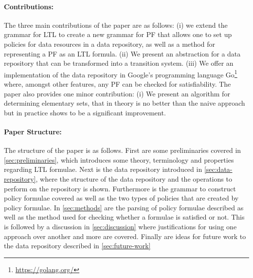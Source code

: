\paragraph{Contributions:} The three main contributions of the paper are as follows: (i) we extend the grammar for LTL to create a new grammar for PF that allows one to set up policies for data resources in a data repository, as well as a method for representing a PF as an LTL formula. (ii) We present an abstraction for a data repository that can be transformed into a transition system. (iii) We offer an implementation of the data repository in Google's programming language Go\footnote{\url{https://golang.org/}} where, amongst other features, any PF can be checked for satisfiability. The paper also provides one minor contribution: (i) We present an algorithm for determining elementary sets, that in theory is no better than the naive approach but in practice shows to be a significant improvement.

\paragraph{Paper Structure:}
The structure of the paper is as follows. First are some preliminaries covered in \autoref{sec:preliminaries}, which introduces some theory, terminology and properties regarding LTL formulae. Next is the data repository introduced in \autoref{sec:data-repository}, where the structure of the data repository and the operations to perform on the repository is shown. Furthermore is the grammar to construct policy formulae covered as well as the two types of policies that are created by policy formulae. In \autoref{sec:methods} are the parsing of policy formulae described as well as the method used for checking whether a formulae is satisfied or not. This is followed by a discussion in \autoref{sec:discussion} where justifications for using one approach over another and more are covered. Finally are ideas for future work to the data repository described in \autoref{sec:future-work}